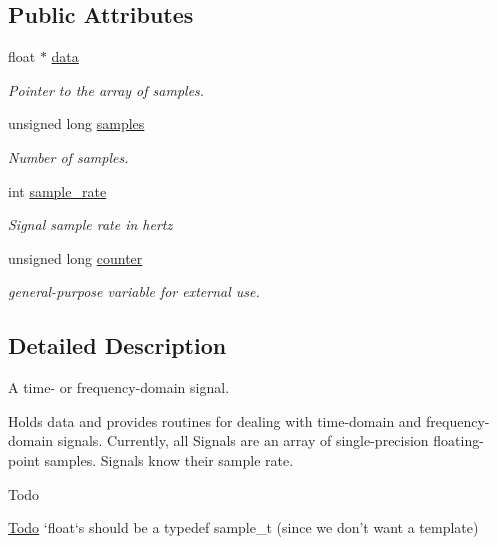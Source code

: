 \subsection*{\-Public \-Attributes}
\begin{DoxyCompactItemize}
\item 
float $\ast$ \hyperlink{classSignal_aa9322b424cb7f66597c8ab19ac402423}{data}
\begin{DoxyCompactList}\small\item\em \-Pointer to the array of samples. \end{DoxyCompactList}\item 
unsigned long \hyperlink{classSignal_a8a51dd9d0f5937b3f3406e66a4d8fc57}{samples}
\begin{DoxyCompactList}\small\item\em \-Number of samples. \end{DoxyCompactList}\item 
int \hyperlink{classSignal_ad07ccb1653bcd36f89f095c7bf7ae877}{sample\-\_\-rate}
\begin{DoxyCompactList}\small\item\em \-Signal sample rate in hertz \end{DoxyCompactList}\item 
\hypertarget{classSignal_a694ee28f771b11f0bb8a2bd4e180bb12}{unsigned long \hyperlink{classSignal_a694ee28f771b11f0bb8a2bd4e180bb12}{counter}}\label{classSignal_a694ee28f771b11f0bb8a2bd4e180bb12}

\begin{DoxyCompactList}\small\item\em general-\/purpose variable for external use. \end{DoxyCompactList}\end{DoxyCompactItemize}


\subsection{\-Detailed \-Description}
\-A time-\/ or frequency-\/domain signal. 

\-Holds data and provides routines for dealing with time-\/domain and frequency-\/domain signals. \-Currently, all \-Signals are an array of single-\/precision floating-\/point samples. \-Signals know their sample rate.

\begin{DoxyRefDesc}{\-Todo}
\item[\hyperlink{todo__todo000004}{\-Todo}]`float`s should be a typedef sample\-\_\-t (since we don't want a template)\end{DoxyRefDesc}


